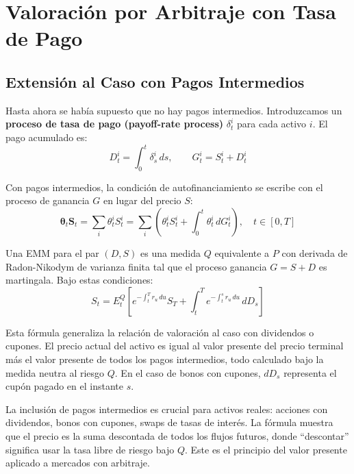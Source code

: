 \documentclass[12pt]{article}
\begin{document}
\section{Valoraci\'on por Arbitraje con Tasa de Pago}

\subsection{Extensi\'on al Caso con Pagos Intermedios}

Hasta ahora se hab\'ia supuesto que no hay pagos intermedios. Introduzcamos un \textbf{proceso de tasa de pago (payoff-rate process)} $\delta_t^i$ para cada activo $i$. El pago acumulado es:
\[
  D_t^i = \int_0^t \delta_s^i \, ds, \qquad G_t^i = S_t^i + D_t^i
\]

Con pagos intermedios, la condici\'on de autofinanciamiento se escribe con el proceso de ganancia $G$ en lugar del precio $S$:
\[
  \boldsymbol{\theta}_t \mathbf{S}_t = \sum_i \theta_t^i S_t^i = \sum_i \!\left(\theta_t^i S_t^i + \int_0^t \theta_t^i \, dG_t^i\right), \quad t \in [0,T]
\]

Una EMM para el par $(D, S)$ es una medida $Q$ equivalente a $P$ con derivada de Radon-Nikodym de varianza finita tal que el proceso ganancia $G = S + D$ es martingala. Bajo estas condiciones:
\begin{equation}
  S_t = E_t^Q\!\left[e^{-\int_t^T r_u\,du} S_T + \int_t^T e^{-\int_t^s r_u\,du} \, dD_s\right]
\end{equation}

\begin{intuicionmat}
Esta f\'ormula generaliza la relaci\'on de valoraci\'on al caso con dividendos o cupones. El precio actual del activo es igual al valor presente del precio terminal m\'as el valor presente de todos los pagos intermedios, todo calculado bajo la medida neutra al riesgo $Q$. En el caso de bonos con cupones, $dD_s$ representa el cupón pagado en el instante $s$.
\end{intuicionmat}

\begin{intuicion}
La inclusi\'on de pagos intermedios es crucial para activos reales: acciones con dividendos, bonos con cupones, swaps de tasas de inter\'es. La f\'ormula muestra que el precio es la suma descontada de todos los flujos futuros, donde ``descontar'' significa usar la tasa libre de riesgo bajo $Q$. Este es el principio del valor presente aplicado a mercados con arbitraje.
\end{intuicion}
\end{document}
